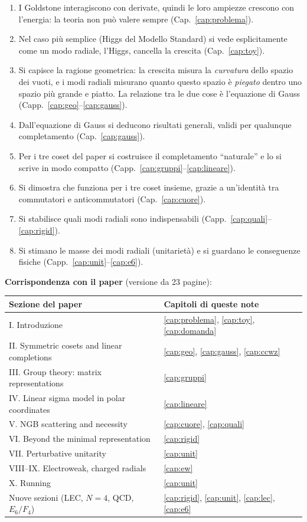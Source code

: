 \documentclass[11pt,a4paper]{article}
\numberwithin{equation}{section}
\theoremstyle{remark}
\begin{document}
\begin{enumerate}[label=\textbf{\arabic*.}]
\item I Goldstone interagiscono con derivate, quindi le loro ampiezze crescono con l'energia: la teoria non può valere sempre (Cap.~\ref{cap:problema}).
\item Nel caso più semplice (Higgs del Modello Standard) si vede esplicitamente come un modo radiale, l'Higgs, cancella la crescita (Cap.~\ref{cap:toy}).
\item Si capisce la ragione geometrica: la crescita misura la \emph{curvatura} dello spazio dei vuoti, e i modi radiali misurano quanto questo spazio è \emph{piegato} dentro uno spazio più grande e piatto. La relazione tra le due cose è l'equazione di Gauss (Capp.~\ref{cap:geo}--\ref{cap:gauss}).
\item Dall'equazione di Gauss si deducono risultati generali, validi per qualunque completamento (Cap.~\ref{cap:gauss}).
\item Per i tre coset del paper si costruisce il completamento ``naturale'' e lo si scrive in modo compatto (Capp.~\ref{cap:gruppi}--\ref{cap:lineare}).
\item Si dimostra che funziona per i tre coset insieme, grazie a un'identità tra commutatori e anticommutatori (Cap.~\ref{cap:cuore}).
\item Si stabilisce quali modi radiali sono indispensabili (Capp.~\ref{cap:quali}--\ref{cap:rigid}).
\item Si stimano le masse dei modi radiali (unitarietà) e si guardano le conseguenze fisiche (Capp.~\ref{cap:unit}--\ref{cap:e6}).
\end{enumerate}

\textbf{Corrispondenza con il paper} (versione da 23 pagine):
\begin{center}
\begin{tabular}{ll}
\hline
Sezione del paper & Capitoli di queste note\\
\hline
I. Introduzione & \ref{cap:problema}, \ref{cap:toy}, \ref{cap:domanda}\\
II. Symmetric cosets and linear completions & \ref{cap:geo}, \ref{cap:gauss}, \ref{cap:ccwz}\\
III. Group theory: matrix representations & \ref{cap:gruppi}\\
IV. Linear sigma model in polar coordinates & \ref{cap:lineare}\\
V. NGB scattering and necessity & \ref{cap:cuore}, \ref{cap:quali}\\
VI. Beyond the minimal representation & \ref{cap:rigid}\\
VII. Perturbative unitarity & \ref{cap:unit}\\
VIII--IX. Electroweak, charged radials & \ref{cap:ew}\\
X. Running & \ref{cap:unit}\\
Nuove sezioni (LEC, $N=4$, QCD, $E_6/F_4$) & \ref{cap:rigid}, \ref{cap:unit}, \ref{cap:lec}, \ref{cap:e6}\\
\hline
\end{tabular}
\end{center}
\end{document}

